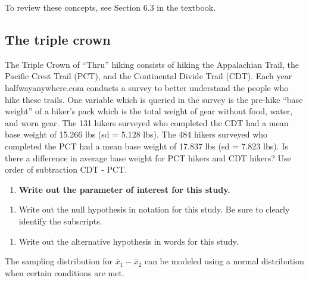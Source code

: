 \documentclass[
]{report}
\providecommand{\tightlist}{%
  \setlength{\itemsep}{0pt}\setlength{\parskip}{0pt}}
\begin{document}
To review these concepts, see Section 6.3 in the textbook.

\hypertarget{the-triple-crown}{%
\subsection{The triple crown}\label{the-triple-crown}}

The Triple Crown of ``Thru'' hiking consists of hiking the Appalachian Trail, the Pacific Crest Trail (PCT), and the Continental Divide Trail (CDT). Each year halfwayanywhere.com conducts a survey to better understand the people who hike these trails. One variable which is queried in the survey is the pre-hike ``base weight'' of a hiker's pack which is the total weight of gear without food, water, and worn gear. The 131 hikers surveyed who completed the CDT had a mean base weight of 15.266 lbs (sd = 5.128 lbs). The 484 hikers surveyed who completed the PCT had a mean base weight of 17.837 lbs (sd = 7.823 lbs). Is there a difference in average base weight for PCT hikers and CDT hikers? Use order of subtraction CDT - PCT.

\begin{enumerate}
\def\labelenumi{\arabic{enumi}.}
\tightlist
\item
  \textbf{Write out the parameter of interest for this study.}
\end{enumerate}

\vspace{0.8in}

\begin{enumerate}
\def\labelenumi{\arabic{enumi}.}
\setcounter{enumi}{1}
\tightlist
\item
  Write out the null hypothesis in notation for this study. Be sure to clearly identify the subscripts.
\end{enumerate}

\vspace{0.5in}

\begin{enumerate}
\def\labelenumi{\arabic{enumi}.}
\setcounter{enumi}{2}
\tightlist
\item
  Write out the alternative hypothesis in words for this study.
\end{enumerate}

\vspace{0.8in}

The sampling distribution for \(\bar{x}_1-\bar{x}_2\) can be modeled using a normal distribution when certain conditions are met.
\end{document}
